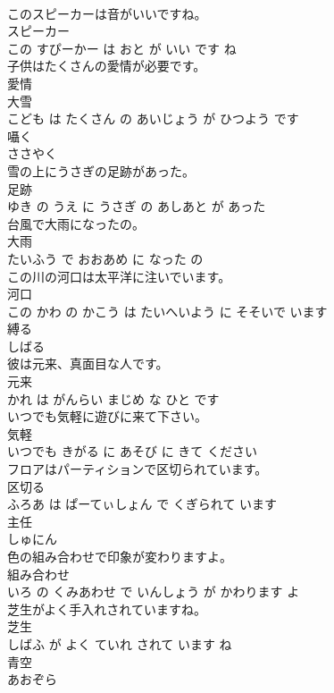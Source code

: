 \documentclass[8pt]{extreport}
\begin{document}
\begin{CJK}{UTF8}{min}
\\	このスピーカーは音がいいですね。	
\\	スピーカー 
\\	この すぴーかー は おと が いい です ね			
\\	子供はたくさんの愛情が必要です。	
\\	愛情 
\\	大雪 
\\	こども は たくさん の あいじょう が ひつよう です			
\\	囁く	
\\	ささやく			
\\	雪の上にうさぎの足跡があった。	
\\	足跡 
\\	ゆき の うえ に うさぎ の あしあと が あった			
\\	台風で大雨になったの。	
\\	大雨 
\\	たいふう で おおあめ に なった の			
\\	この川の河口は太平洋に注いでいます。	
\\	河口 
\\	この かわ の かこう は たいへいよう に そそいで います			
\\	縛る	
\\	しばる			
\\	彼は元来、真面目な人です。	
\\	元来 
\\	かれ は がんらい まじめ な ひと です			
\\	いつでも気軽に遊びに来て下さい。	
\\	気軽 
\\	いつでも きがる に あそび に きて ください			
\\	フロアはパーティションで区切られています。	
\\	区切る 
\\	ふろあ は ぱーてぃしょん で くぎられて います			
\\	主任	
\\	しゅにん			
\\	色の組み合わせで印象が変わりますよ。	
\\	組み合わせ 
\\	いろ の くみあわせ で いんしょう が かわります よ			
\\	芝生がよく手入れされていますね。	
\\	芝生 
\\	しばふ が よく ていれ されて います ね			
\\	青空	
\\	あおぞら			

\end{CJK}
\end{document}
